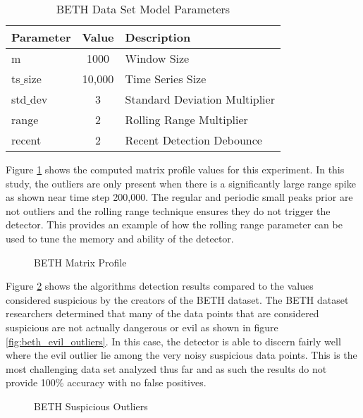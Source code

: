 \begin{table}[H]
\begin{tabular}{|l|c|l|}
    \hline
	\textbf{Parameter} & \textbf{Value} & \textbf{Description} \\ \hline
	m & 1000 & Window Size \\ \hline
	ts$\_$size & 10,000 & Time Series Size \\ \hline
	std$\_$dev & 3 & Standard Deviation Multiplier \\ \hline
	range & 2 & Rolling Range Multiplier\\ \hline
	recent & 2 & Recent Detection Debounce\\ \hline
\end{tabular}
\caption{BETH Data Set Model Parameters}
\label{tab:beth_sim_params}
\end{table}

Figure \ref{fig:beth_mp_hist} shows the computed matrix profile values for this experiment. In this study, the outliers are only present when there is a significantly large range spike as shown near time step 200,000. The regular and periodic small peaks prior are not outliers and the rolling range technique ensures they do not trigger the detector. This provides an example of how the rolling range parameter can be used to tune the memory and ability of the detector. 

\begin{figure}[H]
    
    \caption{BETH Matrix Profile}
    \label{fig:beth_mp_hist}
\end{figure}

Figure \ref{fig:beth_sus_outliers} shows the algorithms detection results compared to the values considered suspicious by the creators of the BETH dataset. The BETH dataset researchers determined that many of the data points that are considered suspicious are not actually dangerous or evil as shown in figure \ref{fig:beth_evil_outliers}. In this case, the detector is able to discern fairly well where the evil outlier lie among the very noisy suspicious data points. This is the most challenging data set analyzed thus far and as such the results do not provide 100\% accuracy with no false positives.

 \begin{figure}[H]
    
    \caption{BETH Suspicious Outliers}
    \label{fig:beth_sus_outliers}
\end{figure}

